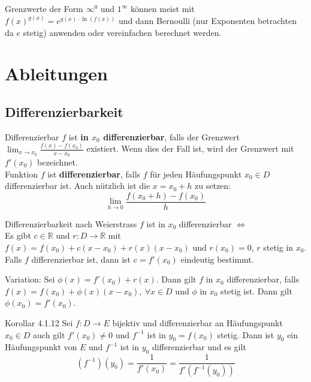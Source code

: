 \documentclass[a4paper,10pt]{article}
\def\R{\mathbb{R}}
\begin{document}
Grenzwerte der Form $\infty^0$ und $1^\infty$ können meist mit $f(x)^{g(x)} = e^{g(x)\cdot \ln(f(x))}$ und dann Bernoulli (nur Exponenten betrachten da $e$ stetig) anwenden oder vereinfachen berechnet werden.

\section{Ableitungen}
\subsection{Differenzierbarkeit}
\begin{mainbox}{Differenzierbar}
	$f$ ist \textbf{in $x_0$ differenzierbar}, falls der Grenzwert $\lim_{x\to x_0} \frac{f(x) - f(x_0)}{x - x_0}$ existiert. Wenn dies der Fall ist, wird der Grenzwert mit $f'(x_0)$ bezeichnet. \\Funktion $f$ ist \textbf{differenzierbar}, falls $f$ für jeden Häufungspunkt $x_0 \in D$ differenzierbar ist. Auch nützlich ist die $x=x_0+h$ zu setzen:
	$$\lim_{h\to 0} \frac{f(x_0+h) - f(x_0)}{h}$$
\end{mainbox}
\begin{subbox}{Differenzierbarkeit nach Weierstrass}
	$f$ ist in $x_0$ differenzierbar $\iff$ \\
	Es gibt $c \in \R$ und $r: D \to \R$ mit $f(x) = f(x_0) + c(x - x_0) + r(x) (x - x_0)$ und $r(x_0) = 0$, $r$ stetig in $x_0$. \\
	Falls $f$ differenzierbar ist, dann ist $c = f'(x_0)$ eindeutig bestimmt.
\end{subbox}
Variation: Sei $\phi(x) = f'(x_0) + r(x)$. Dann gilt $f$ in $x_0$ differenzierbar, falls $f(x) = f(x_0) + \phi(x) (x-x_0), \ \forall x \in D$ und $\phi$ in $x_0$ stetig ist.
Dann gilt $\phi(x_0) = f'(x_0)$.

\begin{subbox}{Korollar 4.1.12}
	Sei $f:D\rightarrow E$ bijektiv und differenzierbar an Häufungspunkt $x_0 \in D$ auch gilt $f'(x_0)\neq 0$ und $f^{-1}$ ist in $y_0=f(x_0)$ stetig. Dann ist $y_0$ ein Häufungspunkt von $E$ und $f^{-1}$ ist in $y_0$ differenzierbar und es gilt
	$$(f^{-1})(y_0)=\frac{1}{f'(x_0)}=\frac{1}{f'(f^{-1}(y_0))}$$
\end{subbox}
\end{document}
